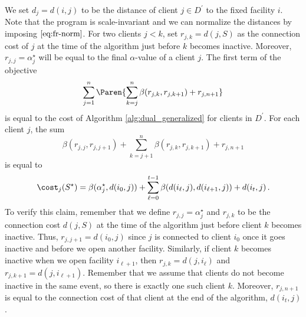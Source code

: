 We set $d_j = d(i,j)$ to be the distance of client $j \in D^\prime$ to the fixed facility $i$. Note that the program is scale-invariant and we can normalize the distances by imposing $\eqref{eq:fr-norm}$. 
For two clients $j < k$, set $r_{j,k} = d(j,S)$ as the connection cost of $j$ at the time of the algorithm just before $k$ becomes inactive. Moreover, $r_{j,j} = \alpha^\star_j$ will be equal to the final $\alpha$-value of a client $j$. 
The first term of the objective 
\begin{equation*}
    \sum_{j=1}^n \Paren{\sum_{k=j}^{n} \beta(r_{j,k}, r_{j,k+1}) + r_{j,n+1}}
\end{equation*}
is equal to the cost of Algorithm \ref{alg:dual_generalized} for clients in $D^\prime$.
For each client $j$, the sum 
\[
     \beta(r_{j,j}, r_{j,j+1}) + \sum_{k=j+1}^{n} \beta(r_{j,k}, r_{j,k+1})+ r_{j,n+1}
\]
is equal to 
\[
    \cost_j(S^\star)
    =
    \beta(\alpha_j^\star,d(i_0,j))
    +
    \sum_{\ell=0}^{t-1}\beta(d(i_\ell,j),d(i_{\ell+1},j))
    +
    d(i_t,j)\,.
\]
To verify this claim, remember that we define $r_{j,j} = \alpha^\star_j$ and $r_{j,k}$ to be the connection cost $d(j,S)$ at the time of the algorithm just before client $k$ becomes inactive. Thus, $r_{j,j+1} = d(i_0,j)$ since $j$ is connected to client $i_0$ once it goes inactive and before we open another facility. Similarly, if client $k$ becomes inactive when we open facility $i_{\ell+1}$, then $r_{j,k} = d(j, i_{\ell})$ and $r_{j,k+1} = d(j, i_{\ell+1})$. Remember that we assume that clients do not become inactive in the same event, so there is exactly one such client $k$. 
Moreover, $r_{j,n+1}$ is equal to the connection cost of that client at the end of the algorithm, $d(i_t,j)$.

